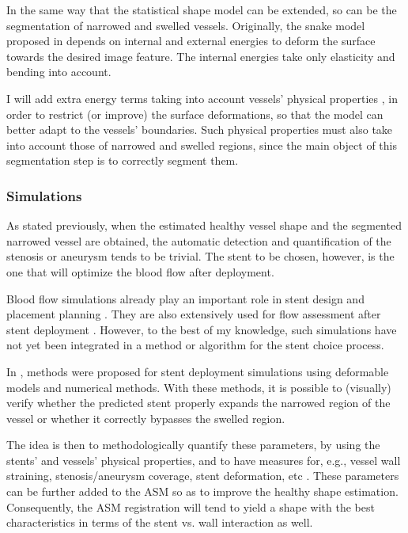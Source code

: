 \challenge
In the same way that the statistical shape model can be extended, so can be the segmentation of narrowed and swelled vessels. Originally, the snake model proposed in \citep{Kass} depends on internal and external energies to deform the surface towards the desired image feature. The internal energies take only elasticity and bending into account. 

\approach
I will add extra energy terms taking into account vessels' physical properties \citep{BOUS-09c,ZAHN-11d}, in order to restrict (or improve) the surface deformations, so that the model can better adapt to the vessels' boundaries. Such physical properties must also take into account those of narrowed and swelled regions, since the main object of this segmentation step is to correctly segment them.

\subsubsection{Simulations}

\challenge
As stated previously, when the estimated healthy vessel shape and the segmented narrowed vessel are obtained, the automatic detection and quantification of the stenosis or aneurysm tends to be trivial. The stent to be chosen, however, is the one that will optimize the blood flow after deployment. 

Blood flow simulations already play an important role in stent design and placement planning \citep{deBeule,ATTI-08}. They are also extensively used for flow assessment after stent deployment \citep{Vuk,Gori}. However, to the best of my knowledge, such simulations have not yet been integrated in a method or algorithm for the stent choice process. 

\approach
In \citep{Florez,deBeule}, methods were proposed for stent deployment simulations using deformable models and numerical methods. With these methods, it is possible to (visually) verify whether the predicted stent properly expands the narrowed region of the vessel or whether it correctly bypasses the swelled region. 

The idea is then to methodologically quantify these parameters, by using the stents' and vessels' physical properties, and to have measures for, e.g., vessel wall straining, stenosis/aneurysm coverage, stent deformation, etc \citep{BOUS-09c,BOUS-08c,SULA-08a}. These parameters can be further added to the ASM so as to improve the healthy shape estimation. Consequently, the ASM registration will tend to yield a shape with the best characteristics in terms of the stent vs. wall interaction as well.

